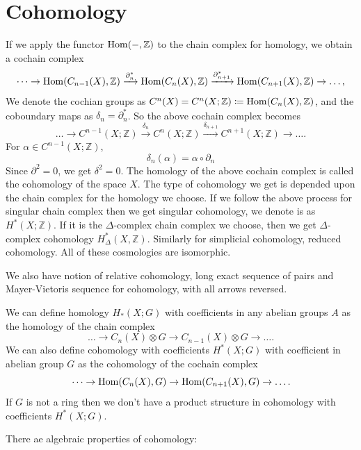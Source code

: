\section{Cohomology}
	If we apply the functor \(\operatorname{Hom}(-, \mathbb Z)\) to the chain complex for homology, we obtain a cochain complex 
	\[\dots \to \operatorname{Hom}(C_{n-1}(X), \mathbb Z) \xrightarrow{\partial_n^\ast} \operatorname{Hom}(C_n(X), \mathbb Z) \xrightarrow{\partial_{n+1}^\ast} \operatorname{Hom}(C_{n+1}(X), \mathbb Z) \to \dots,\]
	We denote the cochian groups as \(C^n(X) = C^n(X;\mathbb Z) \coloneq \operatorname{Hom}(C_n(X), \mathbb Z)\), and the coboundary maps as \(\delta_n = \partial_{n}^\ast\).
	So the above cochain complex becomes
	\[\dots \to C^{n-1}(X;\mathbb Z) \xrightarrow{\delta_n} C^n(X;\mathbb Z) \xrightarrow{\delta_{n+1}} C^{n+1}(X;\mathbb Z) \to \dots.\]
	For \(\alpha \in C^{n-1}(X;\mathbb Z)\),
	\[\delta_n(\alpha) = \alpha\circ \partial_n\]
 	Since \(\partial^2 = 0\), we get \(\delta^2 = 0\).
 	The homology of the above cochain complex is called the cohomology of the space \(X\).
 	The type of cohomology we get is depended upon the chain complex for the homology we choose.
 	If we follow the above process for singular chain complex then we get singular cohomology, we denote is as \(H^\ast(X;\mathbb Z)\).
 	If it is the \(\Delta\)-complex chain complex we choose, then we get \(\Delta\)-complex cohomology \(H^\ast_\Delta(X, \mathbb Z)\).
 	Similarly for simplicial cohomology, reduced cohomology.
 	All of these cosmologies are isomorphic.
 	
 	We also have notion of relative cohomology, long exact sequence of pairs and Mayer-Vietoris sequence for cohomology, with all arrows reversed. 
 	
 	We can define homology \(H_\ast(X; G)\) with coefficients in any abelian groups \(A\) as the homology of the chain complex 
 	\[\dots \to C_n(X) \otimes G \to C_{n-1}(X) \otimes G \to \dots.\]
 	We can also define cohomology with coefficients \(H^\ast(X; G)\) with coefficient in abelian group \(G\) as the cohomology of the cochain complex
 	\[\dots \to \operatorname{Hom}(C_n(X), G) \to \operatorname{Hom}(C_{n+1}(X), G) \to \dots.\]
 	If \(G\) is not a ring then we don't have a product structure in cohomology with coefficients \(H^\ast(X; G)\).
 	
 	There ae algebraic properties of cohomology:
 	\vspace{0.5 cm}
 	
